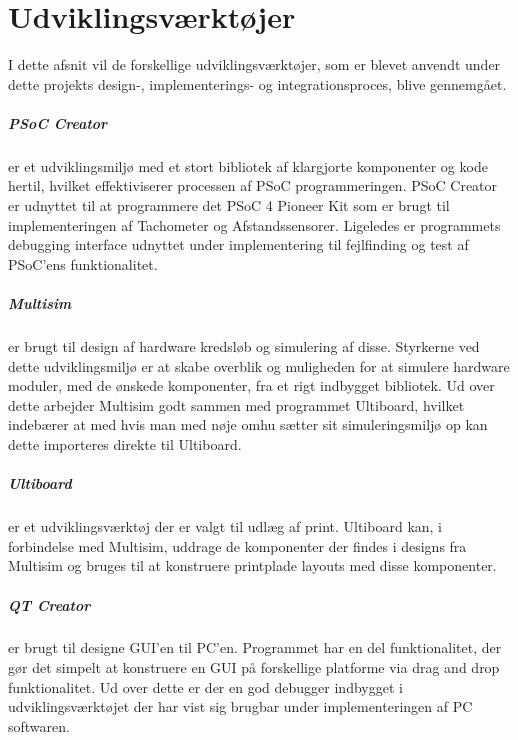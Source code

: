 \chapter{Udviklingsværktøjer} \label{ch:udviklingsvaerktoejer}
I dette afsnit vil de forskellige udviklingsværktøjer, som er blevet anvendt under dette projekts design-, implementerings- og integrationsproces, blive gennemgået.

\paragraph{PSoC Creator} er et udviklingsmiljø med et stort bibliotek af klargjorte komponenter og kode hertil, hvilket effektiviserer processen af PSoC programmeringen.
PSoC Creator er udnyttet til at programmere det PSoC 4 Pioneer Kit som er brugt til implementeringen af Tachometer og Afstandssensorer. Ligeledes er programmets debugging interface udnyttet under implementering til fejlfinding og test af PSoC'ens funktionalitet.

\paragraph{Multisim} er brugt til design af hardware kredsløb og simulering af disse. Styrkerne ved dette udviklingsmiljø er at skabe overblik og muligheden for at simulere hardware moduler, med de ønskede komponenter, fra et rigt indbygget bibliotek. Ud over dette arbejder Multisim godt sammen med programmet Ultiboard, hvilket indebærer at med hvis man med nøje omhu sætter sit simuleringsmiljø op kan dette importeres direkte til Ultiboard.

\paragraph{Ultiboard} er et udviklingsværktøj der er valgt til udlæg af print. Ultiboard kan, i forbindelse med Multisim, uddrage de komponenter der findes i designs fra Multisim og bruges til at konstruere printplade layouts med disse komponenter.

\paragraph{QT Creator} er brugt til designe GUI'en til PC'en. Programmet har en del funktionalitet, der gør det simpelt at konstruere en GUI på forskellige platforme via drag and drop funktionalitet. Ud over dette er der en god debugger indbygget i udviklingsværktøjet der har vist sig brugbar under implementeringen af PC softwaren.

